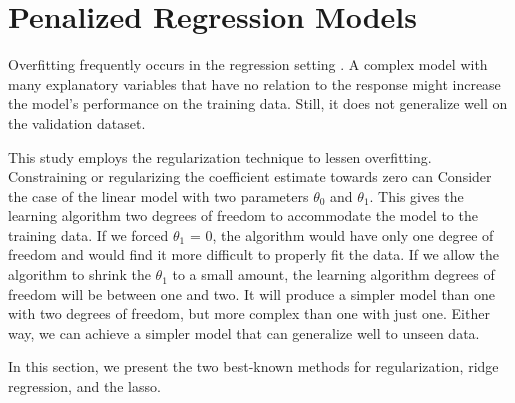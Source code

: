 

\section{Penalized Regression Models}
\label{sec:penalized_regression_models}

Overfitting frequently occurs in the regression setting
\parencite{harrell2015regression}.  A complex model with many explanatory
variables that have no relation to the response might increase the model's
performance on the training data. Still, it does not generalize well on the
validation dataset.

This study employs the regularization technique to lessen overfitting.
Constraining or regularizing the coefficient estimate towards zero can
Consider the case of the linear model with two parameters $\theta_0$ and
$\theta_1$. This gives the learning algorithm two degrees of freedom to
accommodate the model to the training data. If we forced $\theta_1$ = 0, the
algorithm would have only one degree of freedom and would find it more difficult
to properly fit the data. If we allow the algorithm to shrink the $\theta_1$  to
a small amount, the learning algorithm degrees of freedom will be between one
and two. It will produce a simpler model than one with two degrees of freedom,
but more complex than one with just one.  Either way, we can achieve a simpler
model that can generalize well to unseen data.

In this section, we present the two best-known methods for regularization, ridge
regression, and the lasso.


